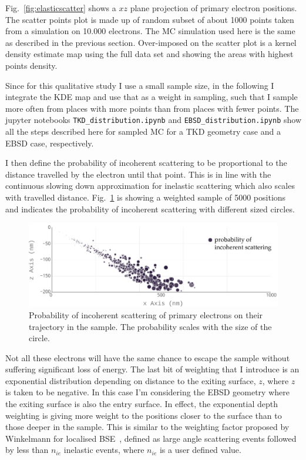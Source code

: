 Fig.~\ref{fig:elasticscatter} shows a $xz$ plane projection of primary electron positions. The scatter points plot is made up of random subset of about 1000 points taken from a simulation on 10.000 electrons. The MC simulation used here is the same as described in the previous section. Over-imposed on the scatter plot is a kernel density estimate map using the full data set and showing the areas with highest points density. 




Since for this qualitative study I use a small sample size, in the following I integrate the KDE map and  use that as a weight in sampling, such that I sample more often from places with more points than from places with fewer points.  The jupyter notebooks \texttt{TKD\_distribution.ipynb} and \texttt{EBSD\_distribution.ipynb} show all the steps described here for sampled MC for a TKD geometry case and a EBSD case, respectively.

I then define the probability of incoherent scattering to be proportional to the distance travelled by the electron until that point. This is in line with the continuous slowing down approximation for inelastic scattering which also scales with travelled distance. Fig.~\ref{fig:incoherentscatter} is showing a weighted sample of 5000 positions and indicates the probability of incoherent scattering with different sized circles.


\begin{figure}[ht]
\centering
\includegraphics[width=5.8in]{Figures/incoherentscatter.png}
\caption[Incoherent scatter probability.]{Probability of incoherent scattering of primary electrons on their trajectory in the sample. The probability scales with the size of the circle.  }
\label{fig:incoherentscatter}
\end{figure}

Not all these electrons will have the same chance to escape the sample without suffering significant loss of energy. The last bit of weighting that I introduce is an exponential distribution depending on distance to the exiting surface, $z$, where $z$ is taken to be negative. In this case I'm considering the EBSD geometry where the exiting surface is also the entry surface. In effect, the exponential depth weighting is giving more weight to the positions closer to the surface than to those deeper in the sample. This is similar to the weighting factor proposed by Winkelmann \etal for localised BSE~\cite{Winkelmann13}, defined as large angle scattering events followed by less than $n_{ie}$ inelastic events, where $n_{ie}$ is a user defined value.

